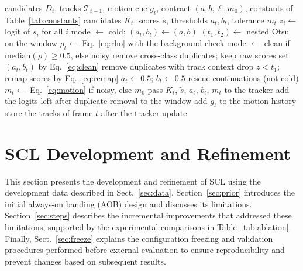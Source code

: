 \documentclass[pdflatex,sn-mathphys-num,iicol]{sn-jnl}
\newcommand{\scl}{SCL}
\newcommand{\aob}{AOB}
\begin{document}
\begin{algorithm}[t]
\caption{\scl{} for frame $t$; the comments name the steps of Fig.~\ref{fig:arch}. The window
holds the logits of frames $t-W$ to $t-1$, so the decision for frame $t$ uses no future frame.}\label{alg:layer}
\begin{algorithmic}[1]
\Require candidates $D_t$, tracks $\mathcal{T}_{t-1}$, motion cue $g_t$, contract $(a,b,\ell,m_0)$, constants of Table~\ref{tab:constants}
\Ensure candidates $K_t$, scores $\tilde{s}$, thresholds $a_t,b_t$, tolerance $m_t$
\State $z_i\gets$ logit of $s_i$ for all $i$ 
 
  \State mode $\gets$ cold; $(a_t,b_t)\gets(a,b)$
\Else
  \State $(t_1,t_2)\gets$ nested Otsu on the window 
  \State $\rho_t\gets$ Eq.~\eqref{eq:rho} with the background check
  \State mode $\gets$ clean if $\mathrm{median}(\rho)\ge0.5$, else noisy 
\EndIf
{} 
  \State remove cross-class duplicates; keep raw scores
   set $(a_t,b_t)$ by Eq.~\eqref{eq:clean}
  \EndIf
\Else {}
  \State remove duplicates with track context
  \State drop $z<t_1$; remap scores by Eq.~\eqref{eq:remap}
  \State $a_t\gets0.5$; $b_t\gets0.5$
\EndIf
\State rescue continuations (not cold) 
\State $m_t\gets$ Eq.~\eqref{eq:motion} if noisy, else $m_0$ 
\State pass $K_t$, $\tilde{s}$, $a_t$, $b_t$, $m_t$ to the tracker
\State add the logits left after duplicate removal to the window
\State add $g_t$ to the motion history
\State store the tracks of frame $t$ after the tracker update
\end{algorithmic}
\end{algorithm}
\section{SCL Development and Refinement}\label{sec:development}

This section presents the development and refinement of \scl{} using the development data
described in Sect.~\ref{sec:data}. Section~\ref{sec:prior} introduces the initial always-on banding
(\aob{}) design and discusses its limitations. Section~\ref{sec:steps} describes the incremental
improvements that addressed these limitations, supported by the experimental comparisons in
Table~\ref{tab:ablation}. Finally, Sect.~\ref{sec:freeze} explains the configuration freezing and
validation procedures performed before external evaluation to ensure reproducibility and prevent
changes based on subsequent results.
\end{document}
